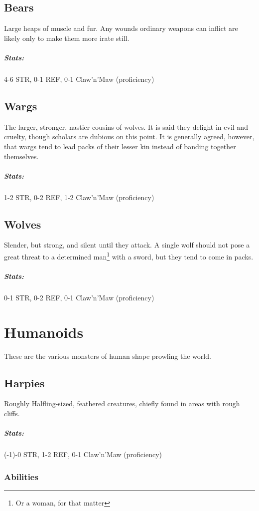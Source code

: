 \subsection{Bears}
Large heaps of muscle and fur. Any wounds ordinary weapons can inflict are likely only to make them more irate still.

\subparagraph{Stats:}
4-6 STR, 0-1 REF, 0-1 Claw'n'Maw (proficiency)

\subsection{Wargs}
The larger, stronger, nastier cousins of wolves. It is said they delight in evil and cruelty, though scholars
are dubious on this point. It is generally agreed, however, that wargs tend to lead packs of their lesser kin
instead of banding together themselves.

\subparagraph{Stats:}
1-2 STR, 0-2 REF, 1-2 Claw'n'Maw (proficiency)

\subsection{Wolves}
Slender, but strong, and silent until they attack. A single wolf should not pose a great threat to a determined
man\footnote{Or a woman, for that matter} with a sword, but they tend to come in packs.

\subparagraph{Stats:}
0-1 STR, 0-2 REF, 0-1 Claw'n'Maw (proficiency)

\section{Humanoids}
These are the various monsters of human shape prowling the world.

\subsection{Harpies}
Roughly Halfling-sized, feathered creatures, chiefly found in areas with rough cliffs.

\subparagraph{Stats:}
(-1)-0 STR, 1-2 REF, 0-1 Claw'n'Maw (proficiency)

\subsubsection{Abilities}



